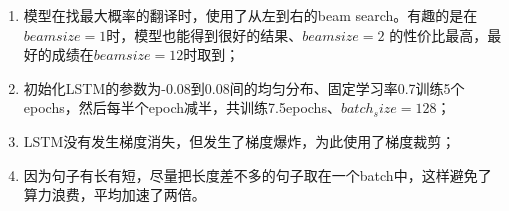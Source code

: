 \documentclass[a4paper,UTF8,no-math]{ctexart}
\begin{document}
	\begin{enumerate}
		\item 模型在找最大概率的翻译时，使用了从左到右的beam search。有趣的是在$ beam size=1 $时，模型也能得到很好的结果、$ beam size =2 $ 的性价比最高，最好的成绩在$ beam size=12 $时取到；
		\item 初始化LSTM的参数为-0.08到0.08间的均匀分布、固定学习率0.7训练5个epochs，然后每半个epoch减半，共训练7.5epochs、$ batch_size=128 $；
		\item LSTM没有发生梯度消失，但发生了梯度爆炸，为此使用了梯度裁剪；
		\item 因为句子有长有短，尽量把长度差不多的句子取在一个batch中，这样避免了算力浪费，平均加速了两倍。
	\end{enumerate}
	
	
\end{document}
